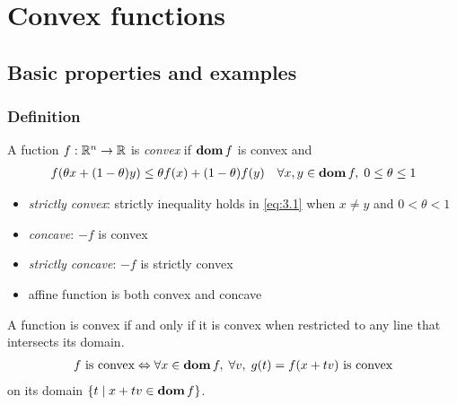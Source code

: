 \chapter{Convex functions}

\section{Basic properties and examples}

\subsection{Definition}
A fuction $f:\mathbb{R}^n\rightarrow\mathbb{R}$ is \textit{convex} if $\mathop{\bf dom} f$ is convex and
\begin{align}
  f(\theta x+(1-\theta)y)\le \theta f(x)+(1-\theta)f(y)\quad\forall x,y\in\mathop{\bf dom} f,\;0\le\theta\le 1\label{eq:3.1}
\end{align}
\begin{itemize}
  \item \textit{strictly convex}: strictly inequality holds in \eqref{eq:3.1} when $x\neq y$ and $0<\theta<1$
  \item \textit{concave}: $-f$ is convex
  \item \textit{strictly concave}: $-f$ is strictly convex
  \item affine function is both convex and concave
\end{itemize}
A function is convex if and only if it is convex when restricted to any line that intersects its domain. \ie
\begin{align*}
  f\text{ is convex}\Leftrightarrow\forall x\in\mathop{\bf dom} f,\;\forall v,\;g(t)=f(x+tv)\text{ is convex}
\end{align*}
on its domain $\{t\mid x+tv\in\mathop{\bf dom} f\}$.

